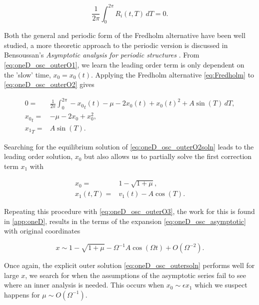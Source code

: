\begin{equation} \label{eq:Fredholm}
\frac{1}{2\pi}\int_0^{2\pi}R_i(t,T)\,dT=0.
\end{equation}

Both the general and periodic form of the Fredholm alternative have been well studied, a more theoretic approach to the periodic version is discussed in Bensoussan's \textit{Asymptotic analysis for periodic structures} \cite{bensoussan2011asymptotic}. From \eqref{eq:oneD_osc_outerO1}, we learn the leading order term is only dependent on the 'slow' time, $x_0=x_0(t)$. Applying the Fredholm alternative \eqref{eq:Fredholm} to \eqref{eq:oneD_osc_outerO2} gives

\begin{equation}\label{eq:oneD_osc_outerO2soln}
\begin{aligned}
0=&\frac{1}{2\pi}\int_0^{2\pi} -{x_0}_t(t) -\mu -2x_0(t)+x_0(t)^2+A\sin(T)\,dT ,\\
{x_0}_t=& -\mu -2x_0+x_0^2 ,\\
{x_1}_T =& A\sin(T).
\end{aligned}
\end{equation}

Searching for the equilibrium solution of \eqref{eq:oneD_osc_outerO2soln} leads to the leading order solution, $x_0$ but also allows us to partially solve the first correction term $x_1$ with

\begin{equation*}
\begin{aligned}
x_0 =& 1-\sqrt{1+\mu},\\
x_1(t,T) =& v_1(t) - A\cos(T).
\end{aligned}
\end{equation*}

Repeating this procedure with \eqref{eq:oneD_osc_outerO3}, the work for this is found in \autoref{app:oneD}, results in the terms of the expansion \eqref{eq:oneD_osc_asymptotic} with original coordinates

\begin{equation}\label{eq:oneD_osc_outersoln}
x\sim 1-\sqrt{1+\mu}-\Omega^{-1} A \cos(\Omega t)+O(\Omega^{-2}).
\end{equation}

Once again, the explicit outer solution \eqref{eq:oneD_osc_outersoln} performs well for large $x$, we search for when the assumptions of the asymptotic series fail to see where an inner analysis is needed. This occurs when $x_0\sim \epsilon x_1$ which we suspect happens for $\mu\sim O(\Omega^{-1})$.


